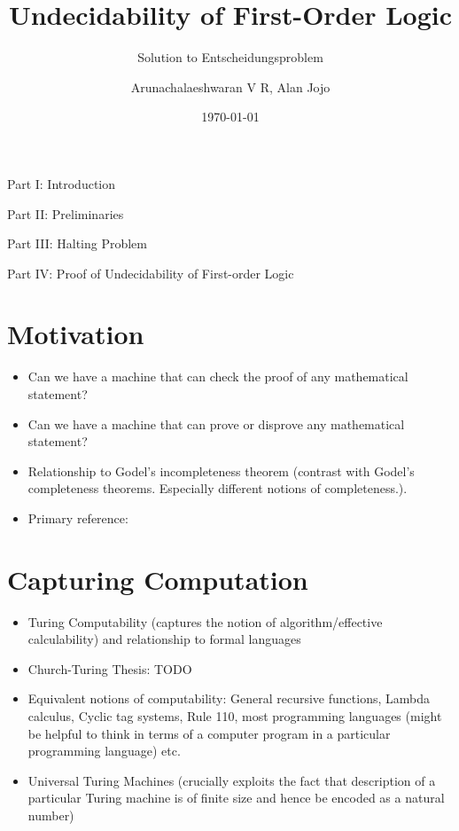 \documentclass[
11pt,notheorems,hyperref={pdfauthor=whatever}
]{beamer}
\title[
]{Undecidability of First-Order Logic}
\subtitle{Solution to Entscheidungsproblem}
\author[
]{
    Arunachalaeshwaran V R,
    Alan Jojo
}
\institute{
    Indian Institute of Science}
\date{\today}
\begin{document}
{
\begin{frame}
  \titlepage
\end{frame}
}
\addtocounter{framenumber}{-1}

\begin{frame}{Part I: Introduction}
    \tableofcontents[part=1]
\end{frame}
\begin{frame}{Part II: Preliminaries}
    \tableofcontents[part=2]
\end{frame}
\begin{frame}{Part III: Halting Problem}
    \tableofcontents[part=3]
\end{frame}
\begin{frame}{Part IV: Proof of Undecidability of First-order Logic}
    \tableofcontents[part=4]
\end{frame}


\section{Motivation}
\begin{frame}
\begin{itemize}
    \item Can we have a machine that can check the proof of any mathematical statement?
    \item Can we have a machine that can prove or disprove any mathematical statement?
    \item Relationship to Godel's incompleteness theorem (contrast with Godel's completeness theorems. Especially different notions of completeness.).
    \item Primary reference: \cite{boolos2002computability}
\end{itemize}     
\end{frame}

\section{Capturing Computation}
\begin{frame}
\begin{itemize}
    \item Turing Computability (captures the notion of algorithm/effective calculability) and relationship to formal languages
    \item Church-Turing Thesis: TODO
    \item Equivalent notions of computability: General recursive functions, Lambda calculus, Cyclic tag systems, Rule 110, most programming languages (might be helpful to think in terms of a computer program in a particular programming language) etc.
    \item Universal Turing Machines (crucially exploits the fact that description of a particular Turing machine is of finite size and hence be encoded as a natural number)
\end{itemize}     
\end{frame}
\end{document}
